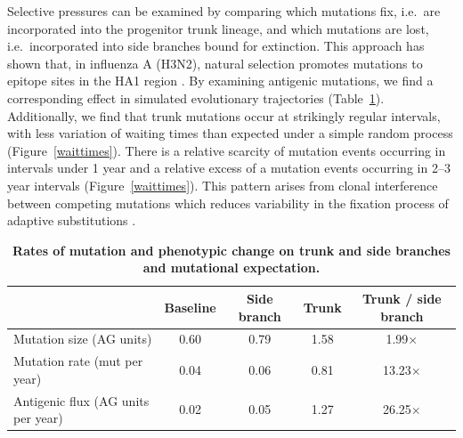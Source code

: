 \documentclass[11pt,oneside,letterpaper]{article}
\begin{document}
Selective pressures can be examined by comparing which mutations fix, i.e.\ are incorporated into the progenitor trunk lineage, and which mutations are lost, i.e.\ incorporated into side branches bound for extinction.  This approach has shown that, in influenza A (H3N2), natural selection promotes mutations to epitope sites in the HA1 region \cite{Bush99MBE,Wolf06}.  By examining antigenic mutations, we find a corresponding effect in simulated evolutionary trajectories (Table~\ref{mktable}).  Additionally, we find that trunk mutations occur at strikingly regular intervals, with less variation of waiting times than expected under a simple random process (Figure~\ref{waittimes}).  There is a relative scarcity of mutation events occurring in intervals under 1 year and a relative excess of a mutation events occurring in 2--3 year intervals (Figure~\ref{waittimes}).  This pattern arises from clonal interference between competing mutations which reduces variability in the fixation process of adaptive substitutions \cite{Park07}.

\begin{table}[tb]
	\centering
	\caption{\textbf{Rates of mutation and phenotypic change on trunk and side branches and mutational expectation.}}
	\label{mktable}
	\begin{tabular*}{1.0\textwidth}{ l c c c c } 
	\hline
		 								& Baseline 	& Side branch 	& Trunk		& Trunk / side branch \\
	\hline				
	Mutation size (AG units)			& 0.60		& 0.79			& 1.58		& 1.99$\times$ \\
	Mutation rate (mut per year)		& 0.04		& 0.06			& 0.81		& 13.23$\times$ \\	
	Antigenic flux (AG units per year)	& 0.02		& 0.05			& 1.27		& 26.25$\times$ \\		
	\hline
	\end{tabular*}
\end{table}
\end{document}
